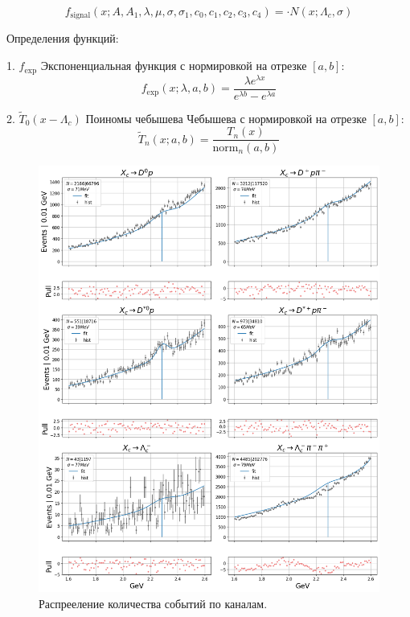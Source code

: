 \begin{equation}
f_{\text{signal}}(x; A, A_1, \lambda, \mu, \sigma, \sigma_1, c_0, c_1, c_2, c_3, c_4) = \cdot {N}(x; \Lambda_c, \sigma) 
\end{equation}

Определения функций:

1. $f_{\text{exp}}$ Экспоненциальная функция с нормировкой на отрезке $[a, b]$:
\begin{equation}
f_{\text{exp}}(x; \lambda, a, b) = \frac{\lambda e^{\lambda x}}{e^{\lambda b} - e^{\lambda a}}
\end{equation}

2. $\tilde T_0(x - \Lambda_c)$ Поиномы чебышева Чебышева с нормировкой на отрезке $[a,b]$:
\begin{equation}
\tilde T_n(x; a, b) = \frac{T_n(x)}{\text{norm}_n(a, b)}
\end{equation}



\begin{figure}[H]
    \centering
    \includegraphics[width=1\linewidth]{img/all_chan_sv.png}
    \caption{Распрееление количества событий по каналам.}
\end{figure}



